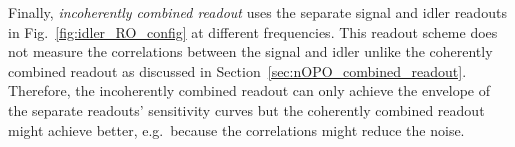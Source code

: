Finally, \emph{incoherently combined readout} uses the separate signal and idler readouts in Fig.~\ref{fig:idler_RO_config} at different frequencies. This readout scheme does not measure the correlations between the signal and idler unlike the coherently combined readout as discussed in Section~\ref{sec:nOPO_combined_readout}. Therefore, the incoherently combined readout can only achieve the envelope of the separate readouts' sensitivity curves but the coherently combined readout might achieve better, e.g.\ because the correlations might reduce the noise.



